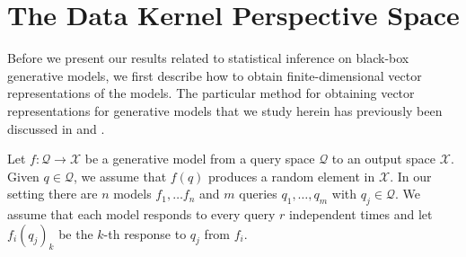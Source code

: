 \section{The Data Kernel Perspective Space}
Before we present our results related to statistical inference on black-box generative models, we first describe how to obtain finite-dimensional vector representations of the models. 
The particular method for obtaining vector representations for generative models that we study herein has previously been discussed in \cite{helm2024tracking} and \cite{aranyak}.



Let $ f: \mathcal{Q} \to \mathcal{X} $ be a generative model from a query space $ \mathcal{Q} $ to an output space $ \mathcal{X} $. 
Given $ q \in \mathcal{Q} $, we assume that $ f(q) $ produces a random element in $ \mathcal{X} $.
In our setting there are $ n $ models $f_{1},\hdots f_{n} $ and $ m $ queries $ q_{1}, \hdots, q_{m} $ with $ q_{j} \in \mathcal{Q} $.
We assume that each model responds to every query $ r $ independent times and let $ f_{i}(q_{j})_{k} $ be the $ k $-th response to $ q_{j} $ from $ f_{i} $. 





